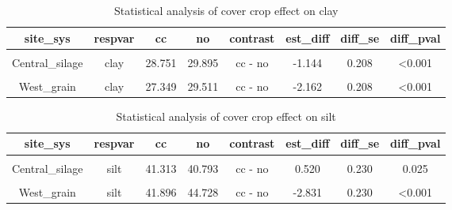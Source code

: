 \documentclass[
]{article}
\begin{document}
\begin{table}[H]

\caption{\label{tab:clay}Statistical analysis of cover crop effect on clay}
\centering
\begin{tabular}[t]{cccccccc}
\toprule
site\_sys & respvar & cc & no & contrast & est\_diff & diff\_se & diff\_pval\\
\midrule
\cellcolor{gray!6}{Central\_grain} & \cellcolor{gray!6}{clay} & \cellcolor{gray!6}{27.740} & \cellcolor{gray!6}{28.000} & \cellcolor{gray!6}{cc - no} & \cellcolor{gray!6}{-0.260} & \cellcolor{gray!6}{0.186} & \cellcolor{gray!6}{0.164}\\
Central\_silage & clay & 28.751 & 29.895 & cc - no & -1.144 & 0.208 & <0.001\\
\cellcolor{gray!6}{East\_grain} & \cellcolor{gray!6}{clay} & \cellcolor{gray!6}{31.730} & \cellcolor{gray!6}{34.606} & \cellcolor{gray!6}{cc - no} & \cellcolor{gray!6}{-2.876} & \cellcolor{gray!6}{0.208} & \cellcolor{gray!6}{<0.001}\\
West\_grain & clay & 27.349 & 29.511 & cc - no & -2.162 & 0.208 & <0.001\\
\bottomrule
\end{tabular}
\end{table}

\begin{table}[H]

\caption{\label{tab:clay}Statistical analysis of cover crop effect on silt}
\centering
\begin{tabular}[t]{cccccccc}
\toprule
site\_sys & respvar & cc & no & contrast & est\_diff & diff\_se & diff\_pval\\
\midrule
\cellcolor{gray!6}{Central\_grain} & \cellcolor{gray!6}{silt} & \cellcolor{gray!6}{39.772} & \cellcolor{gray!6}{40.399} & \cellcolor{gray!6}{cc - no} & \cellcolor{gray!6}{-0.627} & \cellcolor{gray!6}{0.206} & \cellcolor{gray!6}{0.003}\\
Central\_silage & silt & 41.313 & 40.793 & cc - no & 0.520 & 0.230 & 0.025\\
\cellcolor{gray!6}{East\_grain} & \cellcolor{gray!6}{silt} & \cellcolor{gray!6}{55.552} & \cellcolor{gray!6}{55.557} & \cellcolor{gray!6}{cc - no} & \cellcolor{gray!6}{-0.005} & \cellcolor{gray!6}{0.230} & \cellcolor{gray!6}{0.983}\\
West\_grain & silt & 41.896 & 44.728 & cc - no & -2.831 & 0.230 & <0.001\\
\bottomrule
\end{tabular}
\end{table}
\end{document}

